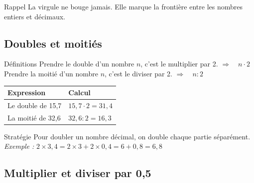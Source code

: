 \begin{astuce}{Rappel}
La virgule ne bouge jamais. Elle marque la frontière entre les nombres entiers et décimaux.
\end{astuce}

\newpage
\semaineinvisible
{}

\vfill
\subsection{Doubles et moitiés}

\begin{regle}{Définitions}
Prendre \textcolor{themeColor}{le double} d'un nombre $n$, c'est le multiplier par 2. \hspace{10pt} $\Longrightarrow\quad n \cdot 2$\\[3pt]
Prendre \textcolor{themeColor}{la moitié} d'un nombre $n$, c'est le diviser par 2. \hspace{29pt} $\Longrightarrow\quad n : 2$
\end{regle}

\def\arraystretch{1.3}
\begin{tabularx}{\linewidth}{|X|X|}
\hline
\cellcolor{themeNO!30}\textbf{Expression} & \cellcolor{themeNO!30}\textbf{Calcul} \\\hline
Le double de 15,7 & $15,7 \cdot 2 = 31,4$ \\\hline
La moitié de 32,6& $32,6 : 2 = 16,3$ \\\hline
\end{tabularx}


\vspace{6pt}
\begin{astuce}{Stratégie}
Pour doubler un nombre décimal, on double chaque partie séparément.\\
\textit{Exemple :} $2 \times 3,4 = 2 \times 3 + 2 \times 0,4 = 6 + 0,8 = 6,8$
\end{astuce}

\vspace{10pt}
\subsection{Multiplier et diviser par 0,5}

